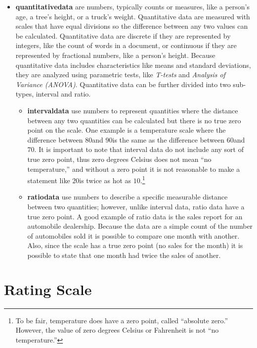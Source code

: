 \begin{itemize}
	\item \textbf{\Gls{quantitativedata}} are numbers, typically counts or measures, like a person's age, a tree's height, or a truck's weight. Quantitative data are measured with scales that have equal divisions so the difference between any two values can be calculated. Quantitative data are discrete if they are represented by integers, like the count of words in a document, or continuous if they are represented by fractional numbers, like a person's height. Because quantitative data includes characteristics like means and standard deviations, they are analyzed using parametric tests, like \textit{T-tests} and \textit{Analysis of Variance (ANOVA)}. Quantitative data can be further divided into two sub-types, interval and ratio.
	
	\begin{itemize}
		\item \textbf{\Gls{intervaldata}} use numbers to represent quantities where the distance between any two quantities can be calculated but there is no true zero point on the scale. One example is a temperature scale where the difference between $ 80 $\textdegree and $ 90 $\textdegree is the same as the difference between $ 60 $\textdegree and $ 70 $\textdegree. It is important to note that interval data do not include any sort of true zero point, thus zero degrees Celsius does not mean ``no temperature,'' and without a zero point it is not reasonable to make a statement like $ 20 $\textdegree is twice as hot as $ 10 $\textdegree.\footnote{To be fair, temperature does have a zero point, called ``absolute zero.'' However, the value of zero degrees Celsius or Fahrenheit is not ``no temperature.''}
		
		\item \textbf{\Gls{ratiodata}} use numbers to describe a specific measurable distance between two quantities; however, unlike interval data, ratio data have a true zero point. A good example of ratio data is the sales report for an automobile dealership. Because the data are a simple count of the number of automobiles sold it is possible to compare one month with another. Also, since the scale has a true zero point (no sales for the month) it is possible to state that one month had twice the sales of another.
	\end{itemize}
\end{itemize}

\section{Rating Scale}

